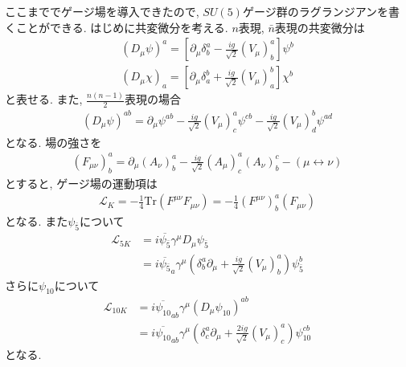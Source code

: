\documentclass[uplatex,dvipdfmx,a4paper,titlepage]{jsbook}
\theoremstyle{plain}
\theoremstyle{definition}
\begin{document}
{ここまででゲージ場を導入できたので, $SU(5)$ゲージ群のラグランジアンを書くことができる.
はじめに共変微分を考える.
$n$表現, $\bar{n}$表現の共変微分は
\begin{align}
  (D_\mu \psi)^a = \left[\partial_\mu \delta^a_b - \frac{ig}{\sqrt{2}}(V_\mu)^a_b\right]\psi^b\nonumber\\
  (D_\mu \chi)_a = \left[\partial_\mu \delta^b_a + \frac{ig}{\sqrt{2}}(V_\mu)^b_a\right]\chi^b\nonumber
\end{align}
と表せる.
また, $\frac{n(n-1)}{2}$表現の場合
\begin{align}
  (D_\mu \psi)^{ab} = \partial_\mu \psi^{ab} - \frac{ig}{\sqrt{2}}(V_\mu)^a_c\psi^{cb}- \frac{ig}{\sqrt{2}}(V_\mu)^b_d\psi^{ad}\nonumber
\end{align}
となる.
場の強さを
\begin{align}
  (F_{\mu\nu})^a_b = \partial_\mu(A_\nu)^a_b -\frac{ig}{\sqrt{2}}(A_\mu)^a_c (A_\nu)^c_b - (\mu\leftrightarrow\nu)
\end{align}
とすると, ゲージ場の運動項は
\begin{align}
  \mathcal{L}_K = -\frac{1}{4}\mathrm{Tr}(F^{\mu\nu}F_{\mu\nu})=-\frac{1}{4}(F^{\mu\nu})^a_b(F_{\mu\nu})
\end{align}
となる.
また$\psi_{\bar{5}}$について
\begin{align}
  \mathcal{L}_{5K} &= i\overline{\psi_{\bar{5}}}\gamma^\mu D_\mu\psi_{\bar{5}}\nonumber\\
                   &= i\overline{\psi_{\bar{5}}}_a\gamma^\mu \left(\delta^a_b \partial_\mu + \frac{ig}{\sqrt{2}}(V_\mu)^a_b\right)\psi_{\bar{5}}^b\nonumber
\end{align}
さらに$\psi_{10}$について
\begin{align}
  \mathcal{L}_{10K} &= i\overline{\psi_{10}}_{ab}\gamma^\mu \left(D_\mu\psi_{10}\right)^{ab}\nonumber\\
                    &= i\overline{\psi_{10}}_{ab}\gamma^\mu \left(\delta^a_c \partial_\mu + \frac{2ig}{\sqrt{2}}(V_\mu)^a_c\right)\psi_{10}^{cb}\nonumber
\end{align}
となる.

}
\end{document}
